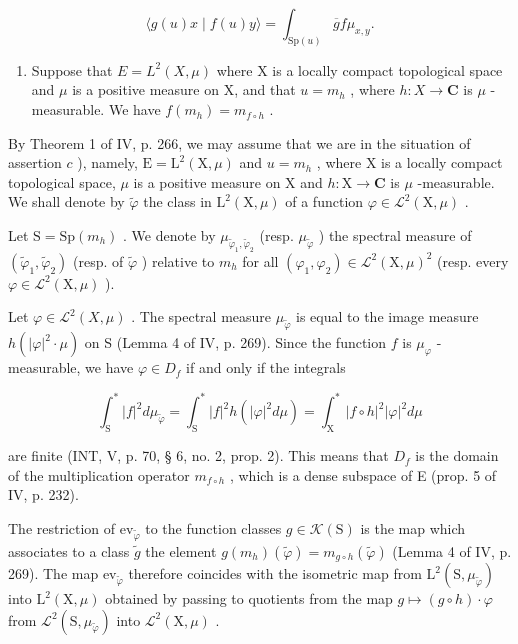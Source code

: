 \[
\langle g (u) x \mid f (u) y \rangle = \int_ {\mathrm{Sp} (u)} \overline {{g}} f \mu_ {x, y}.\tag{7}
\]

\begin{enumerate}
\def\labelenumi{\alph{enumi})}
\setcounter{enumi}{2}
\tightlist
\item
  Suppose that \(E = L^{2}(X, \mu)\) where X is a locally compact topological space and \(\mu\) is a positive measure on X, and that \(u = m_{h}\) , where \(h: X \to \mathbf C\) is \(\mu\) -measurable. We have \(f(m_{h}) = m_{f \circ h}\) .
\end{enumerate}

By Theorem 1 of IV, p. 266, we may assume that we are in the situation of assertion \(c\) ), namely, \(\mathrm{E} = \mathrm{L}^2 (\mathrm{X},\mu)\) and \(u = m_h\) , where X is a locally compact topological space, \(\mu\) is a positive measure on X and \(h\colon \mathrm{X}\to \mathbf{C}\) is \(\mu\) -measurable. We shall denote by \(\widetilde{\varphi}\) the class in \(\mathrm{L}^2 (\mathrm{X},\mu)\) of a function \(\varphi \in \mathcal{L}^2 (\mathrm{X},\mu)\) .

Let \(\mathrm{S} = \mathrm{Sp}(m_h)\) . We denote by \(\mu_{\widetilde{\varphi}_1, \widetilde{\varphi}_2}\) (resp. \(\mu_{\widetilde{\varphi}}\) ) the spectral measure of \((\widetilde{\varphi}_1, \widetilde{\varphi}_2)\) (resp. of \(\widetilde{\varphi}\) ) relative to \(m_h\) for all \((\varphi_1, \varphi_2) \in \mathcal{L}^2(\mathrm{X}, \mu)^2\) (resp. every \(\varphi \in \mathcal{L}^2(\mathrm{X}, \mu)\) ).

Let \(\varphi\in\mathcal{L}^{2}(X,\mu)\) . The spectral measure \(\mu_{\widetilde{\varphi}}\) is equal to the image measure \(h(|\varphi|^{2}\cdot\mu)\) on S (Lemma 4 of IV, p. 269). Since the function \(f\) is \(\mu_{\varphi}\) -measurable, we have \(\varphi\in D_{f}\) if and only if the integrals

\[
\int_ {\mathrm{S}} ^ {*} | f | ^ {2} d \mu_ {\widetilde {\varphi}} = \int_ {\mathrm{S}} ^ {*} | f | ^ {2} h (| \varphi | ^ {2} d \mu) = \int_ {\mathrm{X}} ^ {*} | f \circ h | ^ {2} | \varphi | ^ {2} d \mu
\]

are finite (INT, V, p. 70, § 6, no. 2, prop. 2). This means that \(D_{f}\) is the domain of the multiplication operator \(m_{f\circ h}\) , which is a dense subspace of E (prop. 5 of IV, p. 232).

The restriction of \(\mathrm{ev}_{\widetilde{\varphi}}\) to the function classes \(g \in \mathcal{K}(\mathrm{S})\) is the map which associates to a class \(\widetilde{g}\) the element \(g(m_h)(\widetilde{\varphi}) = m_{g \circ h}(\widetilde{\varphi})\) (Lemma 4 of IV, p. 269). The map \(\mathrm{ev}_{\widetilde{\varphi}}\) therefore coincides with the isometric map from \(\mathrm{L}^2(\mathrm{S}, \mu_{\widetilde{\varphi}})\) into \(\mathrm{L}^2(\mathrm{X}, \mu)\) obtained by passing to quotients from the map \(g \mapsto (g \circ h) \cdot \varphi\) from \(\mathcal{L}^2(\mathrm{S}, \mu_{\widetilde{\varphi}})\) into \(\mathcal{L}^2(\mathrm{X}, \mu)\) .

